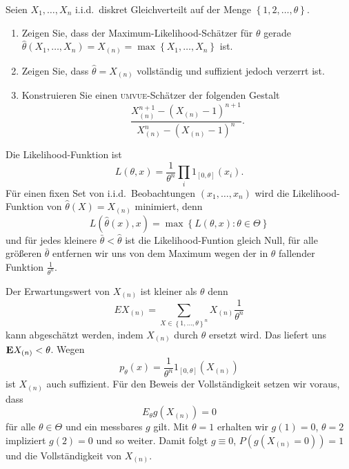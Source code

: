  Seien $X_1,\ldots,X_n$ i.i.d.\ 
diskret Gleichverteilt auf der Menge $\left\{ 1,2,\ldots,\theta \right\}$. 
\begin{enumerate}
    \item Zeigen Sie, dass der Maximum-Likelihood-Schätzer für $\theta$ gerade
        $\hat \theta(X_1,\ldots,X_n) = X_{(n)} = \max \left\{ X_1,\ldots,X_n
        \right\}$ ist.  
    \item Zeigen Sie, dass $\hat \theta = X_{(n)}$ vollständig und suffizient
        jedoch verzerrt ist.
    \item Konstruieren Sie einen \textsc{umvue}-Schätzer der folgenden Gestalt
        \begin{equation*}
            \frac{ X_{(n)}^{n+1} - ( X_{(n)} - 1)^{n+1}  }{ X_{(n)}^n - (X_{(n)} -1)^n }.
        \end{equation*}
\end{enumerate}

\solution
Die Likelihood-Funktion ist
\begin{equation*}
    L(\theta,x) = \frac{1}{\theta^n} \prod_i 1_{[0,\theta]}(x_i).
\end{equation*}
Für einen fixen Set von i.i.d.\ Beobachtungen $(x_1,\ldots,x_n)$ wird die
Likelihood-Funktion von $\hat\theta(X)=X_{(n)}$ minimiert, denn
\begin{equation*}
    L(\hat\theta(x),x) = \max \left\{ L(\theta,x) : \theta\in\Theta \right\}
\end{equation*}
und für jedes kleinere $\bar\theta<\hat\theta$ ist die Likelihood-Funtion
gleich Null, für alle größeren $\bar\theta$ entfernen wir uns von dem Maximum
wegen der in $\theta$ fallender Funktion $\frac{1}{\theta^n}$.

Der Erwartungswert von $X_{(n)}$ ist kleiner als $\theta$ denn 
\begin{equation*}
    E X_{(n)} = \sum_{X\in\left\{ 1,\ldots,\theta \right\}^n}^{} X_{(n)} \frac{1}{\theta^n}
\end{equation*}
kann abgeschätzt werden, indem $X_{(n)}$ durch $\theta$ ersetzt wird. Das liefert uns
$\mathbf{E} X_{(n)} < \theta$. Wegen
\begin{equation*}
    p_\theta(x) = \frac{1}{\theta^n} 1_{[0,\theta]} \left( X_{(n)} \right)
\end{equation*}
ist $X_{(n)}$ auch suffizient. Für den Beweis der Vollständigkeit setzen wir voraus, dass 
\begin{equation*}
    E_{\theta} g(X_{(n)}) =0
\end{equation*}
für alle $\theta\in\Theta$ und ein messbares $g$ gilt.  Mit $\theta=1$ erhalten
wir $g(1)=0$, $\theta=2$ impliziert $g(2)=0$ und so weiter. Damit folgt $g
\equiv 0$, $P( g(X_{(n)} =0))=1$ und die Vollständigkeit von $X_{(n)}$.

